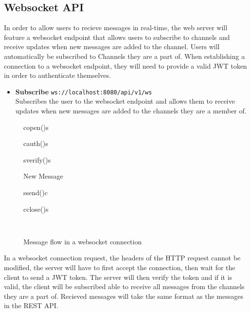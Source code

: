 \documentclass[a4paper,12pt]{article}
\begin{document}
	\subsection{Websocket API}
	\label{subsec:websocket_api}
	In order to allow users to recieve messages in real-time, the web server will feature a websocket endpoint that 
	allows users to subscribe to channels and receive updates when new messages are added to the channel. Users will
	automatically be subscribed to Channels they are a part of. When establishing a connection to a websocket endpoint,
	they will need to provide a valid JWT token in order to authenticate themselves.
	\begin{itemize}
		\item \textbf{Subscribe} \- \texttt{ws://localhost:8080/api/v1/ws} \\
		Subscribes the user to the websocket endpoint and allows them to receive updates when new messages are added
		to the channels they are a member of.
	\end{itemize}
	\begin{figure}[h]
		\caption[Message flow in a websocket connection]{Message flow in a websocket connection}
		\begin{sequencediagram}
			\renewcommand\unitfactor{0.6}
			\begin{call}{c}{open()}{s}{}
				\begin{call}{c}{auth()}{s}{}
					\begin{call}{s}{verify()}{s}{}
					\end{call}
				\end{call}
				\begin{sdblock}{New Message}{}
					\begin{messcall}{s}{send()}{c}
					\end{messcall}
				\end{sdblock}
				\begin{messcall}{c}{close()}{s}{}
				\end{messcall}
			\end{call}
		\end{sequencediagram} \\
	\end{figure}
	
	In a websocket connection request, the headers of the HTTP request cannot be modified, the server will have to first 
	accept the connection, then wait for the client to send a JWT token. The server will then verify the token and if it is 
	valid, the client will be subscribed able to receive all messages from the channels they are a part of. Recieved 
	messages will take the same format as the messages in the REST API.
\end{document}
